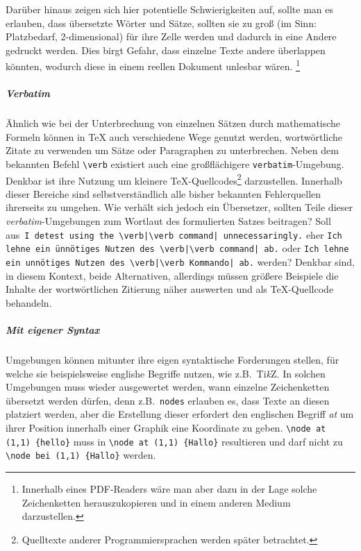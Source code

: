 
Darüber hinaus zeigen sich hier potentielle Schwierigkeiten auf, sollte man es erlauben, dass übersetzte Wörter und Sätze, sollten sie zu groß (im Sinn: Platzbedarf, 2-dimensional) für ihre Zelle werden und dadurch in eine Andere gedruckt werden. Dies birgt Gefahr, dass einzelne Texte andere überlappen könnten, wodurch diese in einem reellen Dokument unlesbar wären.
\footnote{Innerhalb eines PDF-Readers wäre man aber dazu in der Lage solche Zeichenketten herauszukopieren und in einem anderen Medium darzustellen.}

\subparagraph*{Verbatim}\par
Ähnlich wie bei der Unterbrechung von einzelnen Sätzen durch mathematische Formeln können in \TeX{} auch verschiedene Wege genutzt werden, wortwörtliche Zitate zu verwenden um Sätze oder Paragraphen zu unterbrechen. Neben dem bekannten Befehl \verb-\verb- existiert auch eine großflächigere \texttt{verbatim}-Umgebung. Denkbar ist ihre Nutzung um kleinere \TeX{}-Quellcodes\footnote{Quelltexte anderer Programmiersprachen werden später betrachtet.} darzustellen. Innerhalb dieser Bereiche sind selbstverständlich alle bisher bekannten Fehlerquellen ihrerseits zu umgehen. Wie verhält sich jedoch ein Übersetzer, sollten Teile dieser \textit{verbatim}-Umgebungen zum Wortlaut des formulierten Satzes beitragen? Soll aus\ \verb"I detest using the \verb|\verb command| unnecessaringly." eher \verb"Ich lehne ein ünnötiges Nutzen des \verb|\verb command| ab." oder \verb"Ich lehne ein unnötiges Nutzen des \verb|\verb Kommando| ab." werden? Denkbar sind, in diesem Kontext, beide Alternativen, allerdings müssen größere Beispiele die Inhalte der wortwörtlichen Zitierung näher auswerten und als \TeX{}-Quellcode behandeln.

\subparagraph*{Mit eigener Syntax}\par
Umgebungen können mitunter ihre eigen syntaktische Forderungen stellen, für welche sie beispielsweise englishe Begriffe nutzen, wie z.B.\ Ti\textit{k}Z. In solchen Umgebungen muss wieder ausgewertet werden, wann einzelne Zeichenketten übersetzt werden dürfen, denn z.B.\ \texttt{nodes} erlauben es, dass Texte an diesen platziert werden, aber die Erstellung dieser erfordert den englischen Begriff \textit{at} um ihrer Position innerhalb einer Graphik eine Koordinate zu geben.
\verb|\node at (1,1) {hello}| muss in \verb|\node at (1,1) {Hallo}| resultieren und darf nicht zu \verb|\node bei (1,1) {Hallo}| werden. 

